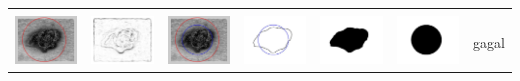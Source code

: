\begin{table}[H]
\begin{tabular}{|m{0.7in}|m{0.7in}|m{0.7in}|m{0.7in}|m{0.7in}|m{0.7in}|m{0.7in}|}
		&  &  & & & &  \\
		\includegraphics[width=0.7in]{dataset/dataset_3/luka_hitam/ready/29_integer_init.jpg}&
		\includegraphics[width=0.7in]{dataset/dataset_3/luka_hitam/ready/29_integer_ext.jpg}&
		\includegraphics[width=0.7in]{dataset/dataset_3/luka_hitam/ready/29_integer_result.jpg}&
		\includegraphics[width=0.7in]{dataset/dataset_3/luka_hitam/ready/29_gt_r_integer.jpg}&
		\includegraphics[width=0.7in]{dataset/dataset_3/luka_hitam/ready/29_r.jpg}&
		\includegraphics[width=0.7in]{dataset/dataset_3/luka_hitam/ready/29_integer_r.jpg}&
		gagal\\
		\hline
		

\end{tabular}
\end{table}

